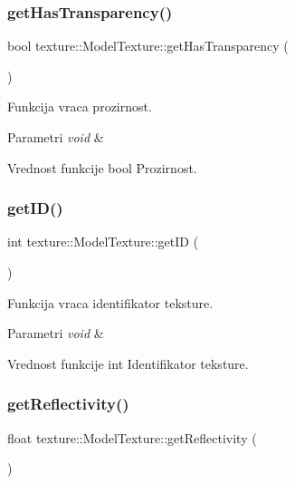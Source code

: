 \subsubsection{\texorpdfstring{get\+Has\+Transparency()}{getHasTransparency()}}
{\footnotesize\ttfamily bool texture\+::\+Model\+Texture\+::get\+Has\+Transparency (\begin{DoxyParamCaption}{ }\end{DoxyParamCaption})}



Funkcija vraca prozirnost. 


\begin{DoxyParams}{Parametri}
{\em void} & \\
\hline
\end{DoxyParams}
\begin{DoxyReturn}{Vrednost funkcije}
bool Prozirnost. 
\end{DoxyReturn}
\mbox{\label{classtexture_1_1Texture_a3eeda8235d9c4cfccccc2ac805eeb864}} 
\subsubsection{\texorpdfstring{get\+I\+D()}{getID()}}
{\footnotesize\ttfamily int texture\+::\+Model\+Texture\+::get\+ID (\begin{DoxyParamCaption}{ }\end{DoxyParamCaption})}



Funkcija vraca identifikator teksture. 


\begin{DoxyParams}{Parametri}
{\em void} & \\
\hline
\end{DoxyParams}
\begin{DoxyReturn}{Vrednost funkcije}
int Identifikator teksture. 
\end{DoxyReturn}
\mbox{\label{classtexture_1_1Texture_a613024c969ec176a1add0c20c3f98969}} 
\subsubsection{\texorpdfstring{get\+Reflectivity()}{getReflectivity()}}
{\footnotesize\ttfamily float texture\+::\+Model\+Texture\+::get\+Reflectivity (\begin{DoxyParamCaption}{ }\end{DoxyParamCaption})}



